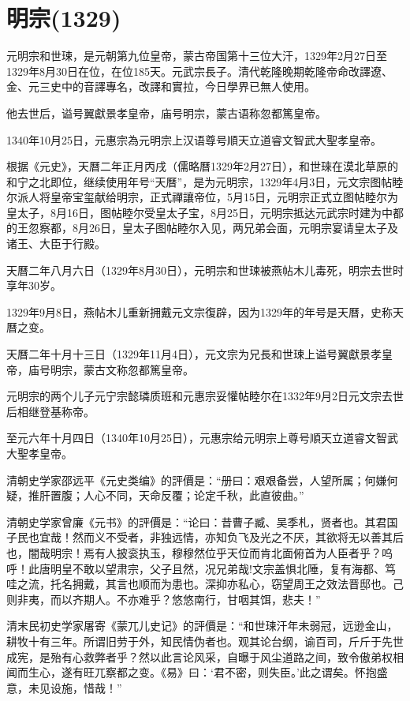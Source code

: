 
\section{明宗\tiny(1329)}

元明宗和世㻋，是元朝第九位皇帝，蒙古帝国第十三位大汗，1329年2月27日至1329年8月30日在位，在位185天。元武宗長子。清代乾隆晚期乾隆帝命改譯遼、金、元三史中的音譯專名，改譯和實拉，今日學界已無人使用。

他去世后，谥号翼獻景孝皇帝，庙号明宗，蒙古语称忽都篤皇帝。

1340年10月25日，元惠宗為元明宗上汉语尊号順天立道睿文智武大聖孝皇帝。

根据《元史》，天曆二年正月丙戌（儒略曆1329年2月27日），和世琜在漠北草原的和宁之北即位，继续使用年号“天曆”，是为元明宗，1329年4月3日，元文宗图帖睦尔派人将皇帝宝玺献给明宗，正式禪讓帝位，5月15日，元明宗正式立图帖睦尔为皇太子，8月16日，图帖睦尔受皇太子宝，8月25日，元明宗抵达元武宗时建为中都的王忽察都，8月26日，皇太子图帖睦尔入见，两兄弟会面，元明宗宴请皇太子及诸王、大臣于行殿。

天曆二年八月六日（1329年8月30日），元明宗和世㻋被燕帖木儿毒死，明宗去世时享年30岁。

1329年9月8日，燕帖木儿重新拥戴元文宗復辟，因为1329年的年号是天曆，史称天曆之变。

天曆二年十月十三日（1329年11月4日），元文宗为兄長和世㻋上谥号翼獻景孝皇帝，庙号明宗，蒙古文称忽都篤皇帝。

元明宗的两个儿子元宁宗懿璘质班和元惠宗妥懽帖睦尔在1332年9月2日元文宗去世后相继登基称帝。

至元六年十月四日（1340年10月25日），元惠宗给元明宗上尊号順天立道睿文智武大聖孝皇帝。

清朝史学家邵远平《元史类编》的評價是：“册曰：艰艰备尝，人望所属；何嫌何疑，推肝置腹；人心不同，天命反覆；论定千秋，此直彼曲。”

清朝史学家曾廉《元书》的評價是：“论曰：昔曹子臧、吴季札，贤者也。其君国子民也宜哉！然而义不受者，非独远情，亦知负飞及光之不厌，其欲将无以善其后也，闇哉明宗！焉有人披衮执玉，穆穆然位乎天位而肯北面俯首为人臣者乎？呜呼！此唐明皇不敢以望肃宗，父子且然，况兄弟哉!文宗盖惧北陲，复有海都、笃哇之流，托名拥戴，其言也顺而为患也。深抑亦私心，窃望周王之效法晋邸也。己则非夷，而以齐期人。不亦难乎？悠悠南行，甘咽其饵，悲夫！”

清末民初史学家屠寄《蒙兀儿史记》的評價是：“和世㻋汗年未弱冠，远逊金山，耕牧十有三年。所谓旧劳于外，知民情伪者也。观其论台纲，谕百司，斤斤于先世成宪，是殆有心救弊者乎？然以此言论风采，自曝于风尘道路之间，致令傲弟权相闻而生心，遂有旺兀察都之变。《易》曰：‘君不密，则失臣。’此之谓矣。怀抱盛意，未见设施，惜哉！”

